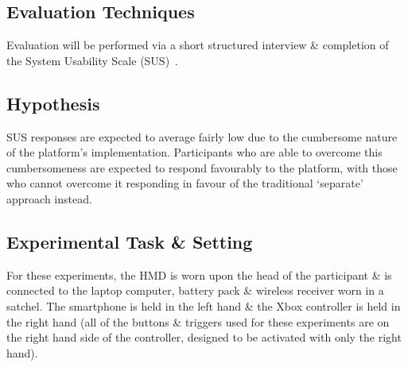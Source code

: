 

\subsection{Evaluation Techniques}
Evaluation will be performed via a short structured interview \& completion of the System Usability Scale (SUS)~\cite{Brooke1996}.


\subsection{Hypothesis}
SUS responses are expected to average fairly low due to the cumbersome nature of the platform's implementation. Participants who are able to overcome this cumbersomeness are expected to respond favourably to the platform, with those who cannot overcome it responding in favour of the traditional `separate' approach instead.


\subsection{Experimental Task \& Setting}
For these experiments, the HMD is worn upon the head of the participant \& is connected to the laptop computer, battery pack \& wireless receiver worn in a satchel. The smartphone is held in the left hand \& the Xbox controller is held in the right hand (all of the buttons \& triggers used for these experiments are on the right hand side of the controller, designed to be activated with only the right hand).

